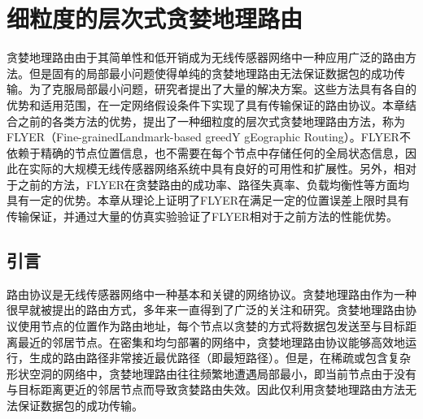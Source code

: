 \chapter{细粒度的层次式贪婪地理路由}
\label{chap:6}
贪婪地理路由由于其简单性和低开销成为无线传感器网络中一种应用广泛的路由方法。但是固有的局部最小问题使得单纯的贪婪地理路由无法保证数据包的成功传输。为了克服局部最小问题，研究者提出了大量的解决方案。这些方法具有各自的优势和适用范围，在一定网络假设条件下实现了具有传输保证的路由协议。本章结合之前的各类方法的优势，提出了一种细粒度的层次式贪婪地理路由方法，称为FLYER（Fine-grainedLandmark-based greedY gEographic Routing）。FLYER不依赖于精确的节点位置信息，也不需要在每个节点中存储任何的全局状态信息，因此在实际的大规模无线传感器网络系统中具有良好的可用性和扩展性。另外，相对于之前的方法，FLYER在贪婪路由的成功率、路径失真率、负载均衡性等方面均具有一定的优势。本章从理论上证明了FLYER在满足一定的位置误差上限时具有传输保证，并通过大量的仿真实验验证了FLYER相对于之前方法的性能优势。
\section{引言}
路由协议是无线传感器网络中一种基本和关键的网络协议。贪婪地理路由作为一种很早就被提出的路由方式，多年来一直得到了广泛的关注和研究。贪婪地理路由协议使用节点的位置作为路由地址，每个节点以贪婪的方式将数据包发送至与目标距离最近的邻居节点。在密集和均匀部署的网络中，贪婪地理路由协议能够高效地运行，生成的路由路径非常接近最优路径（即最短路径）。但是，在稀疏或包含复杂形状空洞的网络中，贪婪地理路由往往频繁地遭遇局部最小，即当前节点由于没有与目标距离更近的邻居节点而导致贪婪路由失效。因此仅利用贪婪地理路由方法无法保证数据包的成功传输。

